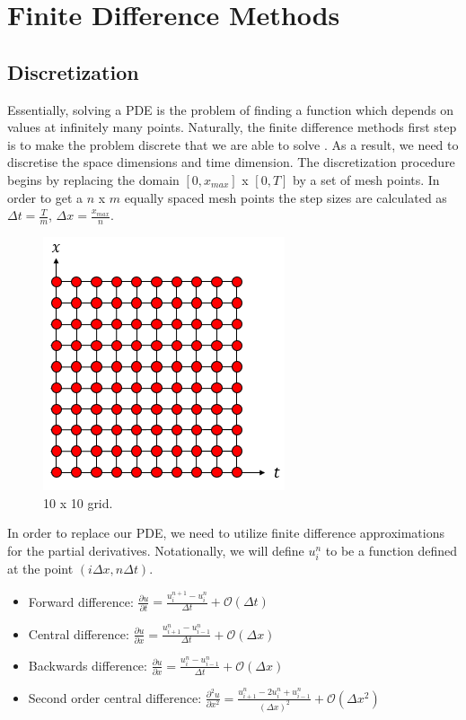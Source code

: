 \documentclass[12pt, oneside]{book}
\theoremstyle{plain}
\theoremstyle{definition}
\begin{document}
\section{Finite Difference Methods}
\subsection{Discretization}
Essentially, solving a PDE is the problem of finding a function which depends on values at infinitely many points. Naturally, the finite difference methods first step is to make the problem discrete that we are able to solve \cite{jwthomas}. As a result, we need to discretise the space dimensions and time dimension. The discretization procedure begins by replacing the domain $[0, x_{max}]$ x  $[0, T]$  by a set of mesh points. In order to get a $n$ x $m$ equally spaced mesh points the step sizes are calculated as $ \Delta t = \frac{T}{m}$, $\Delta x = \frac{x_{max}}{n}$.

\begin{figure}[!htb]
    \centering
        \includegraphics[scale=1]{Discretize.png}
    \caption{10 x 10 grid.}
\end{figure}
In order to replace our PDE, we need to utilize finite difference approximations for the partial derivatives. Notationally, we will define $u^n_i$ to be a function defined at the point $(i \Delta x, n \Delta t) $.

\begin{itemize}
        \item Forward difference: $ \frac{\partial u}{\partial t} = \frac{u^{n+1}_i - u^n_i}{\Delta t} + \mathcal{O}( \Delta t) $
        \item Central difference: $ \frac{\partial u}{\partial x} = \frac{u^n_{i+1} - u^n_{i-1}}{\Delta t}   + \mathcal{O}( \Delta x) $
        \item Backwards difference: $ \frac{\partial u}{\partial x} = \frac{u^{n}_i - u^n_{i - 1}}{\Delta t}  + \mathcal{O}( \Delta x) $
        \item Second order central difference: $ \frac{\partial^2 u}{\partial x^2} = \frac{u^n_{i+1}- 2u^n_i + u^n_{i-1}}{(\Delta x)^2}  + \mathcal{O}( \Delta x^2) $
\end{itemize}
\end{document}
